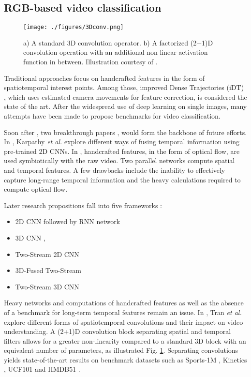 \documentclass[letterpaper, 10 pt, conference]{ieeeconf}
\begin{document}
\subsection{RGB-based video classification} \label{review_rgb_methods}

\begin{figure}[t]
  \centering
  \texttt{[image: ./figures/3Dconv.png]}
  \caption{a) A standard 3D convolution operator. b) A factorized (2+1)D convolution operation with an additional non-linear activation function in between. Illustration courtesy of \cite{tran2018closer}.}
  \label{3Dconv}
\end{figure}

Traditional approaches focus on handcrafted features in the form of spatiotemporal interest points. Among those, improved Dense Trajectories (iDT) \cite{wang2013action}, which uses estimated camera movements for feature correction, is considered the state of the art. After the widespread use of deep learning on single images, many attempts have been made to propose benchmarks for video classification.

Soon after \cite{wang2013action}, two breakthrough papers \cite{karpathy2014large}, \cite{simonyan2014two} would form the backbone of future efforts. In \cite{karpathy2014large}, Karpathy \textit{et al.} explore different ways of fusing temporal information using pre-trained 2D CNNs. In \cite{simonyan2014two}, handcrafted features, in the form of optical flow, are used symbiotically with the raw video. Two parallel networks compute spatial and temporal features. A few drawbacks include the inability to effectively capture long-range temporal information and the heavy calculations required to compute optical flow. 

Later research propositions fall into five frameworks :
\begin{itemize}
    \item 2D CNN followed by RNN network \cite{donahue2015long}
    \item 3D CNN \cite{tran2015learning}, \cite{yao2015describing}
    \item Two-Stream 2D CNN \cite{feichtenhofer2016convolutional}
    \item 3D-Fused Two-Stream \cite{feichtenhofer2016convolutional}
    \item Two-Stream 3D CNN \cite{carreira2017quo}
\end{itemize}

Heavy networks and computations of handcrafted features as well as the absence of a benchmark for long-term temporal features remain an issue. In \cite{tran2018closer}, Tran \textit{et al.} explore different forms of spatiotemporal convolutions and their impact on video understanding. A (2+1)D convolution block separating spatial and temporal filters allows for a greater non-linearity compared to a standard 3D block with an equivalent number of parameters, as illustrated Fig. \ref{3Dconv}. Separating convolutions yields state-of-the-art results on benchmark datasets such as Sports-1M \cite{karpathy2014large}, Kinetics \cite{carreira2017quo}, UCF101 \cite{soomro2012ucf101} and HMDB51 \cite{kuehne2011hmdb}. 
\end{document}
